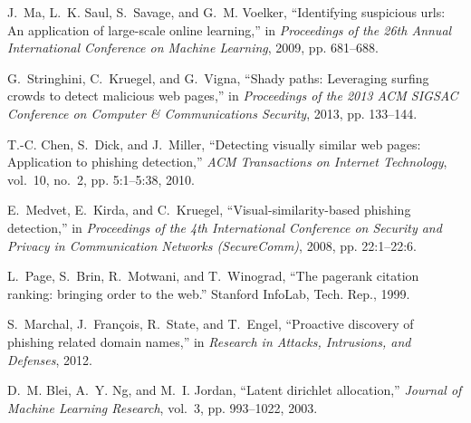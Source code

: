 \documentclass[10pt,conference,compsocconf,letterpaper]{IEEEtran}
\begin{document}
\begin{thebibliography}{10}
J.~Ma, L.~K. Saul, S.~Savage, and G.~M. Voelker, ``Identifying suspicious urls:
  An application of large-scale online learning,'' in \emph{Proceedings of the
  26th Annual International Conference on Machine Learning}, 2009, pp.
  681--688.

G.~Stringhini, C.~Kruegel, and G.~Vigna, ``Shady paths: Leveraging surfing
  crowds to detect malicious web pages,'' in \emph{Proceedings of the 2013 ACM
  SIGSAC Conference on Computer \& Communications Security}, 2013, pp.
  133--144.

T.-C. Chen, S.~Dick, and J.~Miller, ``Detecting visually similar web pages:
  Application to phishing detection,'' \emph{ACM Transactions on Internet
  Technology}, vol.~10, no.~2, pp. 5:1--5:38, 2010.

E.~Medvet, E.~Kirda, and C.~Kruegel, ``Visual-similarity-based phishing
  detection,'' in \emph{Proceedings of the 4th International Conference on
  Security and Privacy in Communication Networks (SecureComm)}, 2008, pp.
  22:1--22:6.

L.~Page, S.~Brin, R.~Motwani, and T.~Winograd, ``The pagerank citation ranking:
  bringing order to the web.'' Stanford InfoLab, Tech. Rep., 1999.

S.~Marchal, J.~Fran{\c{c}}ois, R.~State, and T.~Engel, ``Proactive discovery of
  phishing related domain names,'' in \emph{Research in Attacks, Intrusions,
  and Defenses}, 2012.

D.~M. Blei, A.~Y. Ng, and M.~I. Jordan, ``Latent dirichlet allocation,''
  \emph{Journal of Machine Learning Research}, vol.~3, pp. 993--1022, 2003.

\end{thebibliography}
\end{document}
